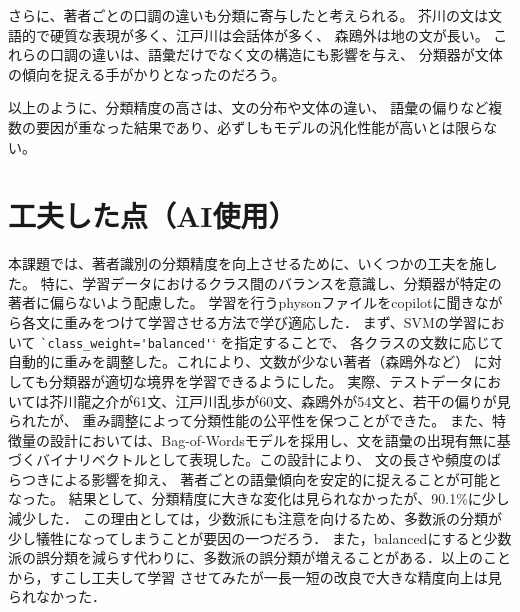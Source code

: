 \documentclass[autodetect-engine,dvi=dvipdfmx,ja=standard,
               a4j,11pt]{bxjsarticle}
\begin{document}
さらに、著者ごとの口調の違いも分類に寄与したと考えられる。
芥川の文は文語的で硬質な表現が多く、江戸川は会話体が多く、
森鴎外は地の文が長い。
これらの口調の違いは、語彙だけでなく文の構造にも影響を与え、
分類器が文体の傾向を捉える手がかりとなったのだろう。

以上のように、分類精度の高さは、文の分布や文体の違い、
語彙の偏りなど複数の要因が重なった結果であり、必ずしもモデルの汎化性能が高いとは限らない。
\section{工夫した点（AI使用）}
本課題では、著者識別の分類精度を向上させるために、いくつかの工夫を施した。
特に、学習データにおけるクラス間のバランスを意識し、分類器が特定の著者に偏らないよう配慮した。
学習を行うphysonファイルをcopilotに聞きながら各文に重みをつけて学習させる方法で学び適応した．
まず、SVMの学習において \verb|`class_weight='balanced'|` を指定することで、
各クラスの文数に応じて自動的に重みを調整した。これにより、文数が少ない著者（森鴎外など）
に対しても分類器が適切な境界を学習できるようにした。
実際、テストデータにおいては芥川龍之介が61文、江戸川乱歩が60文、森鴎外が54文と、若干の偏りが見られたが、
重み調整によって分類性能の公平性を保つことができた。
また、特徴量の設計においては、Bag-of-Wordsモデルを採用し、文を語彙の出現有無に基づくバイナリベクトルとして表現した。この設計により、
文の長さや頻度のばらつきによる影響を抑え、
著者ごとの語彙傾向を安定的に捉えることが可能となった。
結果として、分類精度に大きな変化は見られなかったが、90.1\%に少し減少した．
この理由としては，少数派にも注意を向けるため、多数派の分類が少し犠牲になってしまうことが要因の一つだろう．
また，balancedにすると少数派の誤分類を減らす代わりに、多数派の誤分類が増えることがある．以上のことから，すこし工夫して学習
させてみたが一長一短の改良で大きな精度向上は見られなかった．
\end{document}
